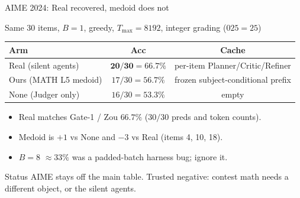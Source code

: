 \documentclass[aspectratio=169]{beamer}
\begin{document}
\begin{frame}{AIME 2024: Real recovered, medoid does not}
\begin{center}
\small Same 30 items, $B{=}1$, greedy, $T_{\max}{=}8192$, integer grading ($025{=}25$)
\end{center}
\begin{center}
\begin{tabular}{lcc}
\toprule
Arm & Acc & Cache \\
\midrule
Real (silent agents) & $\mathbf{20/30=66.7\%}$ & per-item Planner/Critic/Refiner \\
Ours (MATH L5 medoid) & $17/30=56.7\%$ & frozen subject-conditional prefix \\
None (Judger only) & $16/30=53.3\%$ & empty \\
\bottomrule
\end{tabular}
\end{center}
\vspace{0.35em}
\begin{itemize}\small
  \item Real matches Gate-1 / Zou $66.7\%$ ($30/30$ preds and token counts).
  \item Medoid is $+1$ vs None and $-3$ vs Real (items 4, 10, 18).
  \item $B{=}8$ $\approx 33\%$ was a padded-batch harness bug; ignore it.
\end{itemize}
\begin{block}{Status}
AIME stays off the main table. Trusted negative: contest math needs a different object, or the silent agents.
\end{block}
\end{frame}
\end{document}
